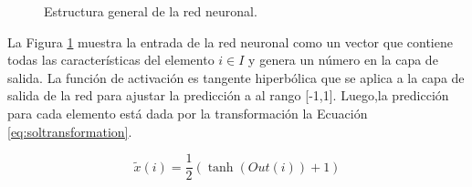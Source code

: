 \documentclass[spanish, a4paper, 12pt, openany,final]{book}
\begin{document}
\begin{figure}[H]
		\caption{Estructura general de la red neuronal.}
		\label{fig:network}
	\end{figure}


La Figura \ref{fig:network} muestra la entrada de la red neuronal como un vector que contiene todas las características del elemento $i \in I$ y genera un número en la capa de salida. La función de activación es tangente hiperbólica que se aplica a la capa de salida de la red para ajustar la predicción a al rango [-1,1]. Luego,la predicción para cada elemento está dada por la  transformación la Ecuación \eqref{eq:soltransformation}. 


\begin{equation}
	\tilde{x}(i) = \frac{1}{2}\left( \tanh(Out(i)) + 1 \right)
	\label{eq:soltransformation}	
\end{equation}
\end{document}
